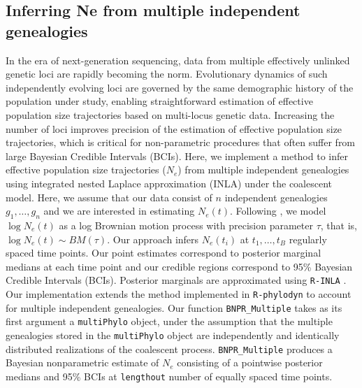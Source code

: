 \documentclass[english,titlepage]{article}
\begin{document}
\subsection*{Inferring Ne from multiple independent genealogies} 
In the era of next-generation sequencing, data from multiple effectively unlinked genetic loci are rapidly becoming the norm. Evolutionary dynamics of such independently evolving loci are governed by the same demographic history of the population under study, enabling straightforward estimation of effective
population size trajectories based on multi-locus genetic data. Increasing the number of loci improves precision of the  estimation of effective population size trajectories, which is critical for non-parametric procedures that often suffer from large Bayesian Credible Intervals (BCIs). Here, we implement a method to infer effective population size trajectories ($N_{e}$) from multiple independent genealogies using integrated nested Laplace approximation (INLA) under the coalescent model. Here, we assume that our data consist of $n$ independent genealogies $g_{1},\ldots,g_{n}$ and we are interested in estimating $N_{e}(t)$. Following \citet{palacios2012INLA}, we model $\log N_{e}(t)$ as a log Brownian motion process with precision parameter $\tau$, that is, $\log N_{e}(t) \sim BM(\tau)$. Our approach infers $N_{e}(t_{i})$ at $t_{1},\ldots,t_{B}$ regularly spaced time points. Our point estimates correspond to posterior marginal medians at each time point and our credible regions correspond to 95\% Bayesian Credible Intervals (BCIs). Posterior marginals are approximated using \texttt{R-INLA} \citep{INLA_2009} . Our implementation extends the method implemented in \texttt{R-phylodyn} to account for multiple independent genealogies. Our function \texttt{BNPR\_Multiple} takes as its first argument a \texttt{multiPhylo} object, under the assumption that the multiple genealogies stored in the \texttt{multiPhylo} object are independently and identically distributed realizations of the coalescent process. \texttt{BNPR\_Multiple} produces a Bayesian nonparametric estimate of $N_{e}$ consisting of a pointwise posterior medians and 95\% BCIs at \texttt{lengthout} number of equally spaced time points. 
\end{document}
